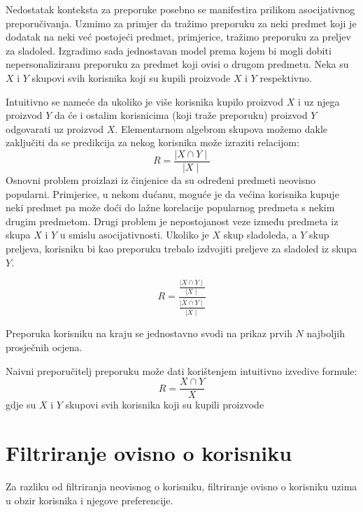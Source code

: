 \documentclass[times, utf8, diplomski, numeric]{fer}
\begin{document}
Nedostatak konteksta za preporuke posebno se manifestira prilikom asocijativnog
preporučivanja. Uzmimo za primjer da tražimo preporuku za neki predmet koji je
dodatak na neki već postojeći predmet, primjerice, tražimo preporuku za preljev
za sladoled.
Izgradimo sada jednostavan model prema kojem bi mogli dobiti nepersonaliziranu
preporuku za predmet koji ovisi o drugom predmetu. Neka su $X$ i $Y$ skupovi
svih korisnika koji su kupili proizvode $X$ i $Y$ respektivno.

Intuitivno se nameće da ukoliko je više korisnika kupilo proizvod $X$ i uz njega
proizvod $Y$ da će i ostalim korisnicima (koji traže preporuku) proizvod $Y$
odgovarati uz proizvod $X$. Elementarnom algebrom skupova možemo dakle
zaključiti da se predikcija za nekog korisnika može izraziti relacijom:
\begin{equation}
\label{eq:naivnaNepersonaliziraniTemp}
	R = \frac{\mid X \cap Y \mid}{\mid X \mid}
\end{equation}
Osnovni problem proizlazi iz činjenice da su određeni predmeti neovisno
popularni. Primjerice, u nekom dućanu, moguće je da većina korisnika kupuje neki
predmet pa može doći do lažne korelacije popularnog predmeta s nekim drugim
predmetom. Drugi problem je nepostojanost veze između predmeta iz skupa $X$ i
$Y$ u smislu asocijativnosti. Ukoliko je $X$ skup sladoleda, a $Y$ skup
preljeva, korisniku bi kao preporuku trebalo izdvojiti preljeve za sladoled iz
skupa $Y$. 

\begin{equation}
\label{eq:nepersonalizirani}
	R = \frac
		{\frac
			{\mid X \cap Y \mid}
			{\mid X \mid}}
		{\frac
			{\mid \overline{X} \cap Y\mid}
			{\mid \overline{X} \mid}}
\end{equation}

Preporuka korisniku na kraju se jednostavno svodi na prikaz prvih $N$ najboljih
prosječnih ocjena.

Naivni preporučitelj preporuku može dati korištenjem intuitivno izvedive
formule:
\begin{equation}
\label{eq:naivnaNepersonalizirani}
	R = \frac{X \cap Y}{X}
\end{equation}
gdje su $X$ i $Y$ skupovi svih korisnika koji su kupili proizvode 

\section{Filtriranje ovisno o korisniku}
Za razliku od filtriranja neovisnog o korisniku, filtriranje ovisno o korisniku
uzima u obzir korisnika i njegove preferencije.
\end{document}
